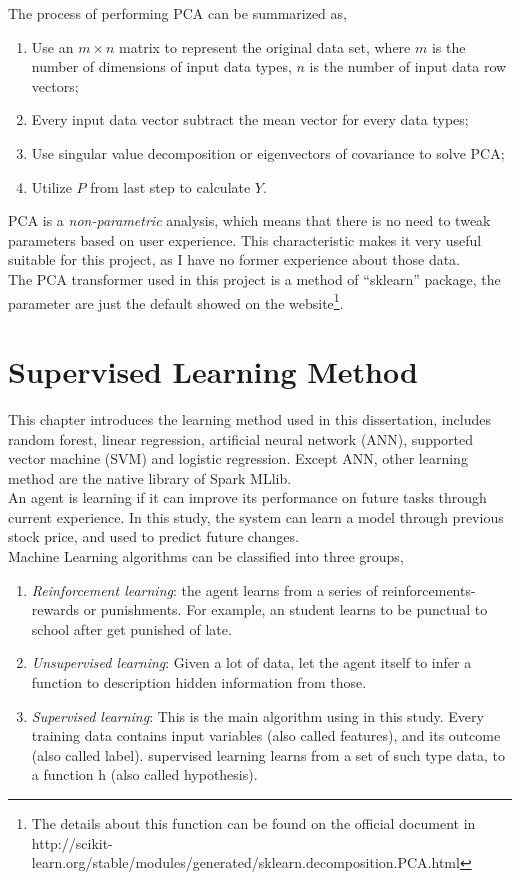 The process of performing PCA can be summarized as\cite{shlens2014tutorial},
\begin{enumerate}
	\item Use an $ m \times n $ matrix to represent the original data set, where $ m $ is the number of dimensions of input data types, $ n $ is the number of input data row vectors;
	\item Every input data vector subtract the mean vector for every data types;
	\item Use singular value decomposition or eigenvectors of covariance to solve PCA;
	\item Utilize $ P $ from last step to calculate $ Y $.
\end{enumerate}

PCA is a \emph{non-parametric} analysis, which means that there is no need to tweak parameters based on user experience\cite{shlens2014tutorial}. This characteristic makes it very useful suitable for this project, as I have no former experience about those data.\\

The PCA transformer used in this project is a method of ``sklearn'' package, the parameter are just the default showed on the website\footnote{The details about this function can be found on the official document in http://scikit-learn.org/stable/modules/generated/sklearn.decomposition.PCA.html}.

\section{Supervised Learning Method}

This chapter introduces the learning method used in this dissertation, includes random forest, linear regression, artificial neural network (ANN), supported vector machine (SVM) and logistic regression. Except ANN, other learning method are the native library of Spark MLlib.\\


An agent is learning if it can improve its performance on future tasks through current experience\cite{russell2003artificial}. In this study, the system can learn a model through previous stock price, and used to predict future changes.\\


Machine Learning algorithms can be classified into three groups\cite{russell2003artificial}, 
\begin{enumerate}
	\item \textit{Reinforcement learning}: the agent learns from a series of reinforcements-rewards or punishments. For example, an student learns to be punctual to school after get punished of late.
	\item \textit{Unsupervised learning}: Given a lot of data, let the agent itself to infer a function to description hidden information from those.
	\item \textit{Supervised learning}: This is the main algorithm using in this study. Every training data contains input variables (also called features), and its outcome (also called label). supervised learning learns from a set of such type data, to a function h (also called hypothesis).
\end{enumerate}


